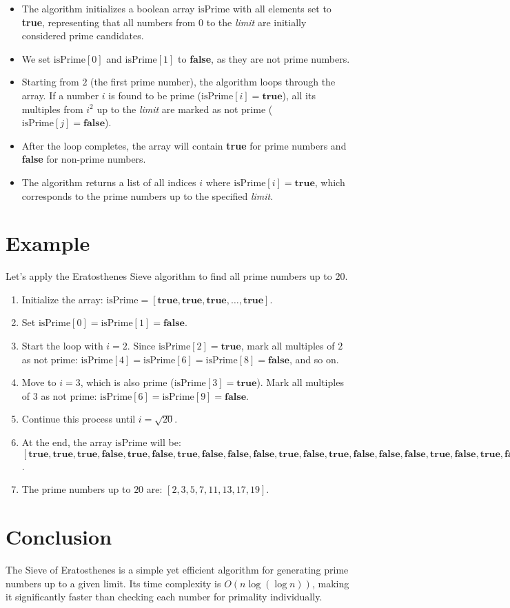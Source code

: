 \documentclass{article}
\begin{document}
\begin{itemize}
\item The algorithm initializes a boolean array $\text{isPrime}$ with all elements set to \textbf{true}, representing that all numbers from $0$ to the \textit{limit} are initially considered prime candidates.
\item We set $\text{isPrime}[0]$ and $\text{isPrime}[1]$ to \textbf{false}, as they are not prime numbers.
\item Starting from $2$ (the first prime number), the algorithm loops through the array. If a number $i$ is found to be prime ($\text{isPrime}[i] = \textbf{true}$), all its multiples from $i^2$ up to the \textit{limit} are marked as not prime ($\text{isPrime}[j] = \textbf{false}$).
\item After the loop completes, the array will contain \textbf{true} for prime numbers and \textbf{false} for non-prime numbers.
\item The algorithm returns a list of all indices $i$ where $\text{isPrime}[i] = \textbf{true}$, which corresponds to the prime numbers up to the specified \textit{limit}.
\end{itemize}

\section{Example}

Let's apply the Eratosthenes Sieve algorithm to find all prime numbers up to $20$.

\begin{enumerate}
\item Initialize the array: $\text{isPrime} = [\textbf{true}, \textbf{true}, \textbf{true}, \ldots, \textbf{true}]$.
\item Set $\text{isPrime}[0] = \text{isPrime}[1] = \textbf{false}$.
\item Start the loop with $i = 2$. Since $\text{isPrime}[2] = \textbf{true}$, mark all multiples of $2$ as not prime: $\text{isPrime}[4] = \text{isPrime}[6] = \text{isPrime}[8] = \textbf{false}$, and so on.
\item Move to $i = 3$, which is also prime ($\text{isPrime}[3] = \textbf{true}$). Mark all multiples of $3$ as not prime: $\text{isPrime}[6] = \text{isPrime}[9] = \textbf{false}$.
\item Continue this process until $i = \sqrt{20}$.
\item At the end, the array $\text{isPrime}$ will be: $[\textbf{true}, \textbf{true}, \textbf{true}, \textbf{false}, \textbf{true}, \textbf{false}, \textbf{true}, \textbf{false}, \textbf{false}, \textbf{false}, \textbf{true}, \textbf{false}, \textbf{true}, \textbf{false}, \textbf{false}, \textbf{false}, \textbf{true}, \textbf{false}, \textbf{true}, \textbf{false}, \textbf{false}]$.
\item The prime numbers up to $20$ are: $[2, 3, 5, 7, 11, 13, 17, 19]$.
\end{enumerate}

\section{Conclusion}

The Sieve of Eratosthenes is a simple yet efficient algorithm for generating prime numbers up to a given limit. Its time complexity is $O(n \log(\log n))$, making it significantly faster than checking each number for primality individually.
\end{document}

